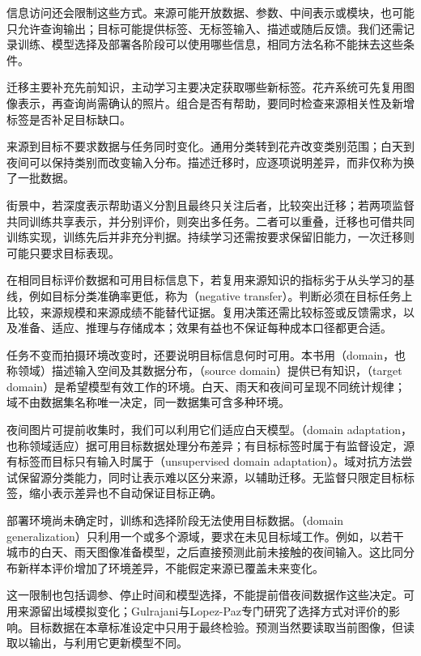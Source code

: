 信息访问还会限制这些方式。来源可能开放数据、参数、中间表示或模块，也可能只允许查询输出；目标可能提供标签、无标签输入、描述或随后反馈。我们还需记录训练、模型选择及部署各阶段可以使用哪些信息，相同方法名称不能抹去这些条件。

迁移主要补充先前知识，主动学习主要决定获取哪些新标签。花卉系统可先复用图像表示，再查询尚需确认的照片。组合是否有帮助，要同时检查来源相关性及新增标签是否补足目标缺口。

来源到目标不要求数据与任务同时变化。通用分类转到花卉改变类别范围；白天到夜间可以保持类别而改变输入分布。描述迁移时，应逐项说明差异，而非仅称为换了一批数据。

街景中，若深度表示帮助语义分割且最终只关注后者，比较突出迁移；若两项监督共同训练共享表示，并分别评价，则突出多任务。二者可以重叠，迁移也可借共同训练实现，训练先后并非充分判据。持续学习还需按要求保留旧能力，一次迁移则可能只要求目标表现。

在相同目标评价数据和可用目标信息下，若复用来源知识的指标劣于从头学习的基线，例如目标分类准确率更低，称为（negative transfer）。判断必须在目标任务上比较，来源规模和来源成绩不能替代证据。复用决策还需比较标签或反馈需求，以及准备、适应、推理与存储成本；效果有益也不保证每种成本口径都更合适。

任务不变而拍摄环境改变时，还要说明目标信息何时可用。本书用（domain，也称领域）描述输入空间及其数据分布，（source domain）提供已有知识，（target domain）是希望模型有效工作的环境。白天、雨天和夜间可呈现不同统计规律；域不由数据集名称唯一决定，同一数据集可含多种环境。

夜间图片可提前收集时，我们可以利用它们适应白天模型。（domain adaptation，也称领域适应）据可用目标数据处理分布差异；有目标标签时属于有监督设定，源有标签而目标只有输入时属于（unsupervised domain adaptation）。域对抗方法尝试保留源分类能力，同时让表示难以区分来源，以辅助迁移。无监督只限定目标标签，缩小表示差异也不自动保证目标正确。

部署环境尚未确定时，训练和选择阶段无法使用目标数据。（domain generalization）只利用一个或多个源域，要求在未见目标域工作。例如，以若干城市的白天、雨天图像准备模型，之后直接预测此前未接触的夜间输入。这比同分布新样本评价增加了环境差异，不能假定来源已覆盖未来变化。

这一限制也包括调参、停止时间和模型选择，不能提前借夜间数据作这些决定。可用来源留出域模拟变化；Gulrajani与Lopez-Paz专门研究了选择方式对评价的影响。目标数据在本章标准设定中只用于最终检验。预测当然要读取当前图像，但读取以输出，与利用它更新模型不同。

